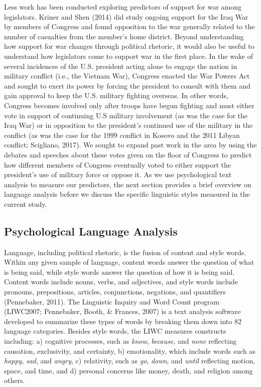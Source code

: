 \documentclass[
  english,
  ,man,floatsintext]{apa6}
\begin{document}
Less work has been conducted exploring predictors of support for war among legislators. Kriner and Shen (2014) did study ongoing support for the Iraq War by members of Congress and found opposition to the war generally related to the number of casualties from the member's home district. Beyond understanding how support for war changes through political rhetoric, it would also be useful to understand how legislators come to support war in the first place. In the wake of several incidences of the U.S. president acting alone to engage the nation in military conflict (i.e., the Vietnam War), Congress enacted the War Powers Act and sought to exert its power by forcing the president to consult with them and gain approval to keep the U.S. military fighting overseas. In other words, Congress becomes involved only after troops have begun fighting and must either vote in support of continuing U.S military involvement (as was the case for the Iraq War) or in opposition to the president's continued use of the military in the conflict (as was the case for the 1999 conflict in Kosovo and the 2011 Libyan conflict; Scigliano, 2017). We sought to expand past work in the area by using the debates and speeches about these votes given on the floor of Congress to predict how different members of Congress eventually voted to either support the president's use of military force or oppose it. As we use psychological text analysis to measure our predictors, the next section provides a brief overview on language analysis before we discuss the specific linguistic styles measured in the current study.

\hypertarget{psychological-language-analysis}{%
\subsection{Psychological Language Analysis}\label{psychological-language-analysis}}

Language, including political rhetoric, is the fusion of content and style words. Within any given sample of language, content words answer the question of what is being said, while style words answer the question of how it is being said. Content words include nouns, verbs, and adjectives, and style words include pronouns, prepositions, articles, conjunctions, negations, and quantifiers (Pennebaker, 2011). The Linguistic Inquiry and Word Count program (LIWC2007; Pennebaker, Booth, \& Frances, 2007) is a text analysis software developed to summarize these types of words by breaking them down into 82 language categories. Besides style words, the LIWC measures constructs including: a) cognitive processes, such as \emph{know}, \emph{because}, and \emph{none} reflecting causation, exclusivity, and certainty, b) emotionality, which include words such as \emph{happy}, \emph{sad}, and \emph{angry}, c) relativity, such as \emph{go}, \emph{down}, and \emph{until} reflecting motion, space, and time, and d) personal concerns like money, death, and religion among others.
\end{document}
